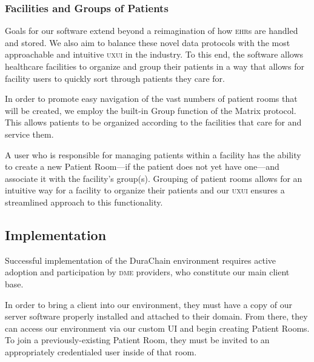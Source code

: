 
\subsubsection{Facilities and Groups of Patients}
Goals for our software extend beyond a reimagination of how \textsc{ehr}s are handled and stored. We also aim to balance these novel data protocols with the most approachable and intuitive \textsc{uxui} in the industry. To this end, the software allows healthcare facilities to organize and group their patients in a way that allows for facility users to quickly sort through patients they care for.%

In order to promote easy navigation of the vast numbers of patient rooms that will be created, we employ the built-in Group function of the Matrix protocol. This allows patients to be organized according to the facilities that care for and service them.%

A user who is responsible for managing patients within a facility has the ability to create a new Patient Room---if the patient does not yet have one---and associate it with the facility's group(s). Grouping of patient rooms allows for an intuitive way for a facility to organize their patients and our \textsc{uxui} ensures a streamlined approach to this functionality.%

 \subsection{Implementation}
 Successful implementation of the DuraChain environment requires active adoption and participation by \textsc{dme} providers, who constitute our main client base.%

 In order to bring a client into our environment, they must have a copy of our server software properly installed and attached to their domain. From there, they can access our environment via our custom UI and begin creating Patient Rooms. To join a previously-existing Patient Room, they must be invited to an appropriately credentialed user inside of that room.%

